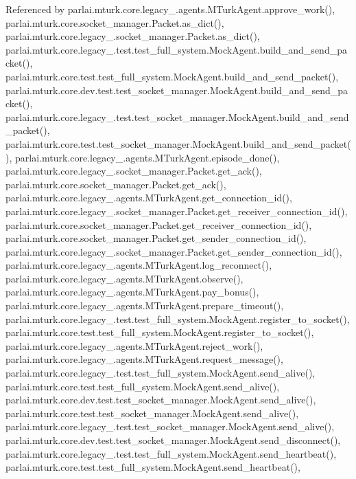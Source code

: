 Referenced by parlai.\+mturk.\+core.\+legacy\+\_.\+agents.\+M\+Turk\+Agent.\+approve\+\_\+work(), parlai.\+mturk.\+core.\+socket\+\_\+manager.\+Packet.\+as\+\_\+dict(), parlai.\+mturk.\+core.\+legacy\+\_.\+socket\+\_\+manager.\+Packet.\+as\+\_\+dict(), parlai.\+mturk.\+core.\+legacy\+\_.\+test.\+test\+\_\+full\+\_\+system.\+Mock\+Agent.\+build\+\_\+and\+\_\+send\+\_\+packet(), parlai.\+mturk.\+core.\+test.\+test\+\_\+full\+\_\+system.\+Mock\+Agent.\+build\+\_\+and\+\_\+send\+\_\+packet(), parlai.\+mturk.\+core.\+dev.\+test.\+test\+\_\+socket\+\_\+manager.\+Mock\+Agent.\+build\+\_\+and\+\_\+send\+\_\+packet(), parlai.\+mturk.\+core.\+legacy\+\_.\+test.\+test\+\_\+socket\+\_\+manager.\+Mock\+Agent.\+build\+\_\+and\+\_\+send\+\_\+packet(), parlai.\+mturk.\+core.\+test.\+test\+\_\+socket\+\_\+manager.\+Mock\+Agent.\+build\+\_\+and\+\_\+send\+\_\+packet(), parlai.\+mturk.\+core.\+legacy\+\_.\+agents.\+M\+Turk\+Agent.\+episode\+\_\+done(), parlai.\+mturk.\+core.\+legacy\+\_.\+socket\+\_\+manager.\+Packet.\+get\+\_\+ack(), parlai.\+mturk.\+core.\+socket\+\_\+manager.\+Packet.\+get\+\_\+ack(), parlai.\+mturk.\+core.\+legacy\+\_.\+agents.\+M\+Turk\+Agent.\+get\+\_\+connection\+\_\+id(), parlai.\+mturk.\+core.\+legacy\+\_.\+socket\+\_\+manager.\+Packet.\+get\+\_\+receiver\+\_\+connection\+\_\+id(), parlai.\+mturk.\+core.\+socket\+\_\+manager.\+Packet.\+get\+\_\+receiver\+\_\+connection\+\_\+id(), parlai.\+mturk.\+core.\+socket\+\_\+manager.\+Packet.\+get\+\_\+sender\+\_\+connection\+\_\+id(), parlai.\+mturk.\+core.\+legacy\+\_.\+socket\+\_\+manager.\+Packet.\+get\+\_\+sender\+\_\+connection\+\_\+id(), parlai.\+mturk.\+core.\+legacy\+\_.\+agents.\+M\+Turk\+Agent.\+log\+\_\+reconnect(), parlai.\+mturk.\+core.\+legacy\+\_.\+agents.\+M\+Turk\+Agent.\+observe(), parlai.\+mturk.\+core.\+legacy\+\_.\+agents.\+M\+Turk\+Agent.\+pay\+\_\+bonus(), parlai.\+mturk.\+core.\+legacy\+\_.\+agents.\+M\+Turk\+Agent.\+prepare\+\_\+timeout(), parlai.\+mturk.\+core.\+legacy\+\_.\+test.\+test\+\_\+full\+\_\+system.\+Mock\+Agent.\+register\+\_\+to\+\_\+socket(), parlai.\+mturk.\+core.\+test.\+test\+\_\+full\+\_\+system.\+Mock\+Agent.\+register\+\_\+to\+\_\+socket(), parlai.\+mturk.\+core.\+legacy\+\_.\+agents.\+M\+Turk\+Agent.\+reject\+\_\+work(), parlai.\+mturk.\+core.\+legacy\+\_.\+agents.\+M\+Turk\+Agent.\+request\+\_\+message(), parlai.\+mturk.\+core.\+legacy\+\_.\+test.\+test\+\_\+full\+\_\+system.\+Mock\+Agent.\+send\+\_\+alive(), parlai.\+mturk.\+core.\+test.\+test\+\_\+full\+\_\+system.\+Mock\+Agent.\+send\+\_\+alive(), parlai.\+mturk.\+core.\+dev.\+test.\+test\+\_\+socket\+\_\+manager.\+Mock\+Agent.\+send\+\_\+alive(), parlai.\+mturk.\+core.\+test.\+test\+\_\+socket\+\_\+manager.\+Mock\+Agent.\+send\+\_\+alive(), parlai.\+mturk.\+core.\+legacy\+\_.\+test.\+test\+\_\+socket\+\_\+manager.\+Mock\+Agent.\+send\+\_\+alive(), parlai.\+mturk.\+core.\+dev.\+test.\+test\+\_\+socket\+\_\+manager.\+Mock\+Agent.\+send\+\_\+disconnect(), parlai.\+mturk.\+core.\+legacy\+\_.\+test.\+test\+\_\+full\+\_\+system.\+Mock\+Agent.\+send\+\_\+heartbeat(), parlai.\+mturk.\+core.\+test.\+test\+\_\+full\+\_\+system.\+Mock\+Agent.\+send\+\_\+heartbeat(), 